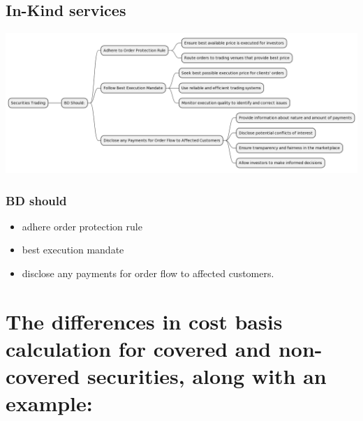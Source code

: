 \documentclass[11pt]{article}
\begin{document}
\subsection{In-Kind services}
\label{sec:org82c1393}

\begin{center}
\includegraphics[width=.9\linewidth]{./in-kind-service.png}
\end{center}



\subsubsection{BD should}
\label{sec:orge86844a}
\begin{itemize}
\item adhere order protection rule
\item best execution mandate
\item disclose any payments for order flow to affected customers.
\end{itemize}
\section{The differences in cost basis calculation for covered and non-covered securities, along with an example:}
\label{sec:orgc043d1f}
\end{document}
